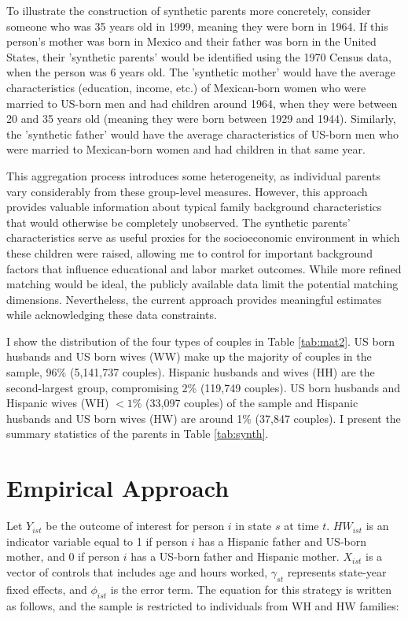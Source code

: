 To illustrate the construction of synthetic parents more concretely, consider someone who was 35 years old in 1999, meaning they were born in 1964. If this person's mother was born in Mexico and their father was born in the United States, their 'synthetic parents' would be identified using the 1970 Census data, when the person was 6 years old. The 'synthetic mother' would have the average characteristics (education, income, etc.) of Mexican-born women who were married to US-born men and had children around 1964, when they were between 20 and 35 years old (meaning they were born between 1929 and 1944). Similarly, the 'synthetic father' would have the average characteristics of US-born men who were married to Mexican-born women and had children in that same year.

This aggregation process introduces some heterogeneity, as individual parents vary considerably from these group-level measures. However, this approach provides valuable information about typical family background characteristics that would otherwise be completely unobserved. The synthetic parents' characteristics serve as useful proxies for the socioeconomic environment in which these children were raised, allowing me to control for important background factors that influence educational and labor market outcomes. While more refined matching would be ideal, the publicly available data limit the potential matching dimensions. Nevertheless, the current approach provides meaningful estimates while acknowledging these data constraints.

I show the distribution of the four types of couples in Table \ref{tab:mat2}. US born husbands and US born wives (WW) make up the majority of couples in the sample, 96\% (5,141,737 couples). Hispanic husbands and wives (HH) are the second-largest group, compromising 2\% (119,749 couples). US born husbands and Hispanic wives (WH) $< 1\%$ (33,097 couples) of the sample and Hispanic husbands and US born wives (HW) are around 1\% (37,847 couples). I present the summary statistics of the parents in Table \ref{tab:synth}.

\section{Empirical Approach}\label{sec:emp_model}

Let $Y_{ist}$ be the outcome of interest for person $i$ in state $s$ at time $t$. $HW_{ist}$ is an indicator variable equal to 1 if person $i$ has a Hispanic father and US-born mother, and 0 if person $i$ has a US-born father and Hispanic mother. $X_{ist}$ is a vector of controls that includes age and hours worked, $\gamma_{st}$ represents state-year fixed effects, and $\phi_{ist}$ is the error term. The equation for this strategy is written as follows, and the sample is restricted to individuals from WH and HW families:

